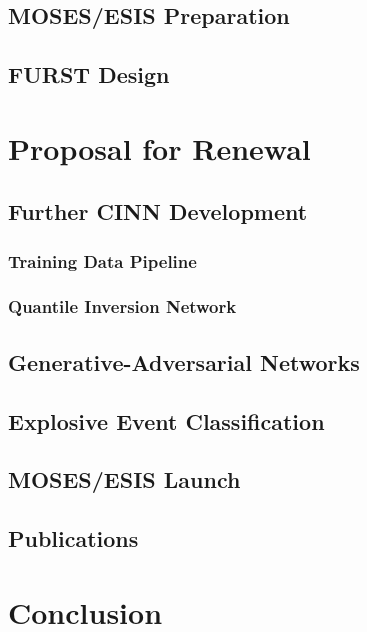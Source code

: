 \documentclass[10pt,letterpaper]{article}
\begin{document}
		\subsection{MOSES/ESIS Preparation}
		
		\subsection{FURST Design}
	
	\section{Proposal for Renewal}
	
		\subsection{Further CINN Development}
		
			\subsubsection{Training Data Pipeline}
		
			\subsubsection{Quantile Inversion Network}
			
			\subsection{Generative-Adversarial Networks}	\label{sec_gan}
		
		\subsection{Explosive Event Classification}
		
			
		
		\subsection{MOSES/ESIS Launch}
		
		\subsection{Publications}
	
	\section{Conclusion}
	
\end{document}
